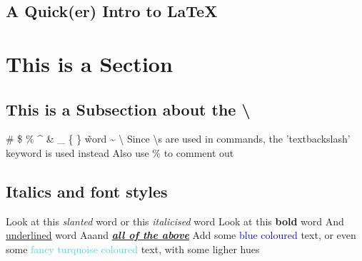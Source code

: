 \documentclass[12pt,twoside,a4paper]{article}
\begin{document}
\begin{center}
  \section*{A Quick(er) Intro to \LaTeX}
\end{center}

\section*{This is a Section}

\subsection*{This is a Subsection about the \textbackslash}

\# \$ \% \^{} \& \_ \{ \} \~word \~{} \textbackslash
\newline \newline Since \textbackslash s are used in commands, the 'textbackslash' keyword is used instead
\newline Also use \% to comment out %

\subsection*{Italics and font styles}
Look at this \textsl{slanted} word
\newline or this \textit{italicised} word %
\newline Look at this \textbf{bold} word \newline And \underline{underlined} word
\newline Aaand \textbf{\textit{\underline{all of the above}}}
\newline \newline Add some \textcolor{blue}{blue coloured} text, or even some
\textcolor{Turquoise}{fancy turquoise coloured} text, with some
\textcolor{TurquoiseLighter2}{ligher hues}
\newpage
\end{document}
